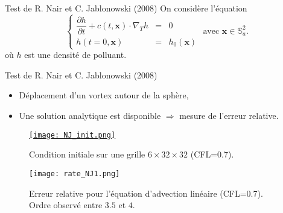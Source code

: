 \documentclass[11pt]{beamer}
\begin{document}
\begin{frame}{Test de R. Nair et C. Jablonowski (2008)}
On considère l'équation
$$
\left\lbrace
\begin{array}{rcl}
\dfrac{\partial h}{\partial t} + c(t,\mathbf{x}) \cdot \nabla_T h & = & 0  \\
h(t=0,\mathbf{x}) & = & h_0(\mathbf{x})
\end{array}
\right. \text{ avec } \mathbf{x} \in \mathbb{S}_a^2.
$$
où $h$ est une densité de polluant.
\begin{exampleblock}{Test de R. Nair et C. Jablonowski (2008)}
\begin{itemize}
\item Déplacement d'un vortex autour de la sphère,
\item Une solution analytique est disponible $\Rightarrow$ mesure de l'erreur relative.
\end{itemize}
\end{exampleblock}
\end{frame}



\begin{frame}{}
\begin{figure}
\begin{center}
\href{run:./simus/ref_7363145849_test_2.avi}{\texttt{[image: NJ\_init.png]}}
\end{center}
\caption{Condition initiale sur une grille $6 \times 32 \times 32$ (CFL=0.7).}
\end{figure}
\end{frame}







\begin{frame}
\begin{figure}
\begin{center}
\texttt{[image: rate\_NJ1.png]}
\end{center}
\caption{Erreur relative pour l'équation d'advection linéaire (CFL=0.7). Ordre observé entre $3.5$ et $4$.}
\end{figure}
\end{frame}
\end{document}
